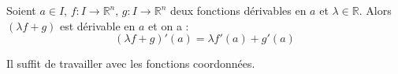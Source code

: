 \documentclass[a4paper,10pt]{report}
\begin{document}
\begin{Proposition}{} Soient $a \in I$, $f : I \rightarrow \mathbb{R}^n$, $g : I \rightarrow \mathbb{R}^n$ deux fonctions dérivables en $a$ et $\lambda \in \mathbb{R}$. Alors $(\lambda f+g)$ est dérivable en $a$ et on a :
$$ (\lambda f+g)'(a) = \lambda f'(a) + g'(a) $$
\end{Proposition}

\begin{Demonstration}{} Il suffit de travailler avec les fonctions coordonnées.
\end{Demonstration}

%

\end{document}
